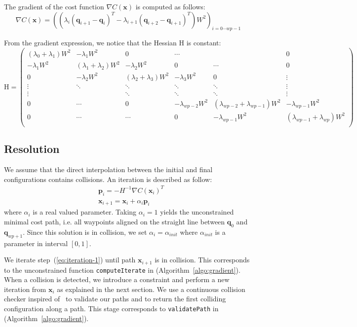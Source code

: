 \documentclass{tADR2e}
\newcommand\p{\mathbf{p}}
\newcommand\conf{\mathbf{q}}
\newcommand\xx{\mathbf{x}} %
\newcommand\cost{C}
\newcommand\weight{W}
\begin{document}
The gradient of the cost function $\nabla \cost (\xx)$ is computed as follows:
$$
\nabla \cost (\xx) = 
\left( (\lambda_{i}(\conf_{i+1} - \conf_{i})^T - \lambda_{i+1}(\conf_{i+2} - \conf_{i+1})^T) \weight^2 \right)_{i=0\cdots wp-1}
$$


From the gradient expression, we notice that the Hessian $\mbox{H}$ is constant:
$$
\mbox{H} = \left(\begin{array}{cccccc}
(\lambda_{0}+\lambda_{1})\weight^2 & -\lambda_{1}\weight^2 & 0 & \cdots & & 0 \\
-\lambda_{1}\weight^2 & (\lambda_{1}+\lambda_{2})\weight^2 & -\lambda_{2}\weight^2 & 0 & \cdots & 0 \\
0 & -\lambda_{2}\weight^2 &  (\lambda_{2}+\lambda_{3})\weight^2 & -\lambda_{3}\weight^2 & 0 & \vdots \\
\vdots & \ddots & \ddots & \ddots & \ddots & \vdots\\
\vdots & & \ddots & \ddots & \ddots & \vdots\\
0 & \cdots  & 0 & -\lambda_{wp-2}\weight^2 & (\lambda_{wp-2}+\lambda_{wp-1})\weight^2 & -\lambda_{wp-1}\weight^2 \\
0 & \cdots &  \cdots & 0 & -\lambda_{wp-1}\weight^2 & (\lambda_{wp-1}+\lambda_{wp})\weight^2  \\
\end{array}\right)
$$

\subsection {Resolution}
We assume that the direct interpolation between the initial and final configurations contains collisions. An iteration is described as follow:
\begin{equation}\label{eq:iteration-1}
\begin{split}
& \p_i =  -H^{-1} \nabla \cost(\xx_i)^{T} \\
& \xx_{i+1} =  \xx_{i} + \alpha_i \p_i
\end{split} 
\end{equation}
where $\alpha_i$ is a real valued parameter. Taking $\alpha_i=1$ yields the 
unconstrained minimal cost path, i.e. all waypoints aligned on the straight line 
between $\conf_0$ and $\conf_{wp+1}$. Since this solution is in collision, we set 
$\alpha_i = \alpha_{init}$
where $\alpha_{init}$ is a parameter in interval $[0,1]$.

We iterate step~(\ref{eq:iteration-1}) until path $\xx_{i+1}$ is in collision. This 
corresponds to the unconstrained function \texttt{computeIterate} in 
(Algorithm~\ref{algo:gradient}).
When a collision is detected, we introduce a constraint and perform a new 
iteration from $\xx_i$ as explained in the next section. We use a continuous 
collision checker inspired of~\cite{SchwarzerExactCollision} to validate our 
paths and to return the first colliding configuration along a path. This stage corresponds to \texttt{validatePath} in (Algorithm~\ref{algo:gradient}).
\end{document}
